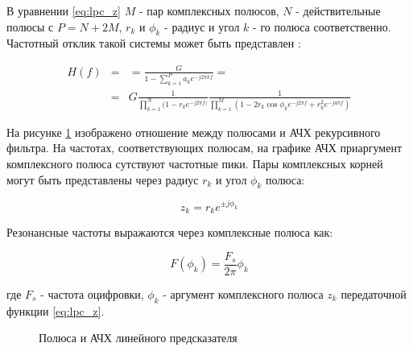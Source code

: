 В уравнении \ref{eq:lpc_z} ${M}$ - пар комплексных полюсов, ${N}$ - действительные полюсы с ${P=N+2M}$,
${r_k}$ и ${\phi_k}$ - радиус и угол ${k}$ - го полюса соответственно. Частотный отклик такой системы 
может быть представлен \cite{saeed_book}:
\begin{center}
\begin{eqnarray}
	\label{eq:lpc_freq_resp}
		H(f)	& = & = \frac{G}{1 - \sum \limits_{k=1}^P a_k e^{-j2 \pi kf}} =  \nonumber \\
			& = & G\frac{1}{\prod \limits_{k=1}^N (1-r_k e^{-j2 \pi f)}} \frac{1}{\prod \limits_{k=1}^M (1-2r_k \cos \phi_k e^{-j2 \pi f} + r_k^2 e^{-j4 \pi f})}
\end{eqnarray}
\end{center}

На рисунке \ref{pic:lpc_poles} изображено отношение между полюсами и АЧХ рекурсивного фильтра. На частотах, соответствующих полюсам,
на графике АЧХ приаргумент комплексного полюса сутствуют частотные пики. Пары комплексных корней могут быть представлены через радиус ${r_k}$ и угол ${\phi_k}$
полюса:

\begin{center}
\begin{equation}
	\label{eq:lpc_poles}
	z_k = r_k e^{\pm j \phi_k}
\end{equation}
\end{center}

Резонансные частоты выражаются через комплексные полюса как:
\begin{center}
\begin{equation}
	\label{eq:lpc_poles_freq}
	F(\phi_k)=\frac{F_s}{2 \pi} \phi_k
\end{equation}
\end{center}
где ${F_s}$ - частота оцифровки, ${\phi_k}$ - аргумент комплексного полюса ${z_k}$ передаточной функции \ref{eq:lpc_z}.

\begin{figure}[H]
	\center{}
	\caption{Полюса и АЧХ линейного предсказателя}
	\label{pic:lpc_poles}
\end{figure}


